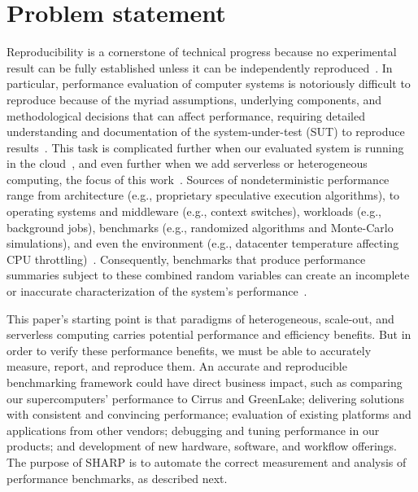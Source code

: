 \documentclass[11pt]{article}
\begin{document}
\section*{Problem statement}

Reproducibility is a cornerstone of technical progress because no experimental result can be fully established unless it can be independently reproduced~\cite{feitelson06:experimental}.
In particular, performance evaluation of computer systems is notoriously difficult to reproduce because of the myriad assumptions, underlying components, and methodological decisions that can affect performance, requiring detailed understanding and documentation of the system-under-test (SUT) to reproduce results~\cite{collberg16:repeatability, vitek11:repeatability}.
This task is complicated further when our evaluated system is running in the cloud~\cite{papadopoulos19:methodological}, and even further when we add serverless or heterogeneous computing, the focus of this work~\cite{garland13:determinism, hocko10:reducing}.
Sources of nondeterministic performance range from architecture (e.g., proprietary speculative execution algorithms), to operating systems and middleware (e.g., context switches), workloads (e.g., background jobs), benchmarks (e.g., randomized algorithms and Monte-Carlo simulations), and even the environment (e.g., datacenter temperature affecting CPU throttling)~\cite{cappello10:communication, gonnord23:survey, papadopoulos19:methodological}.
Consequently, benchmarks that produce performance summaries subject to these combined random variables can create an incomplete or inaccurate characterization of the system's performance~\cite{chiang13:determinism}.

This paper's starting point is that paradigms of heterogeneous, scale-out, and serverless computing carries potential performance and efficiency benefits.
But in order to verify these performance benefits, we must be able to accurately measure, report, and reproduce them.
An accurate and reproducible benchmarking framework could have direct business impact, such as comparing our supercomputers' performance to Cirrus and GreenLake; delivering solutions with consistent and convincing performance; evaluation of existing platforms and applications from other vendors; debugging and tuning performance in our products; and development of new hardware, software, and workflow offerings. %
The purpose of SHARP is to automate the correct measurement and analysis of performance benchmarks, as described next.
\end{document}
